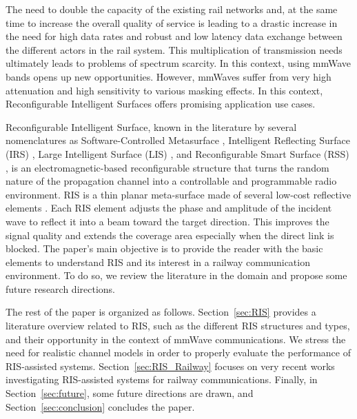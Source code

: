 \documentclass[conference]{IEEEtran}
\begin{document}
The need to double the capacity of the existing rail networks and, at the same time to increase the overall quality of service is leading to a drastic increase in the need for high data rates and robust and low latency data exchange between the different actors in the rail system. This multiplication of transmission needs ultimately leads to problems of spectrum scarcity. In this context, using mmWave bands opens up new opportunities. However, mmWaves  suffer from very high attenuation and high sensitivity to various masking effects. In this context, Reconfigurable Intelligent Surfaces offers promising application use cases.

Reconfigurable Intelligent Surface, known in the literature by several nomenclatures as  Software-Controlled Metasurface \cite{liaskos2018new}, Intelligent Reflecting Surface (IRS) \cite{9326394}, Large Intelligent Surface (LIS) \cite{8644519}, and Reconfigurable Smart Surface (RSS) \cite{alfattani2021link},  is an electromagnetic-based reconfigurable structure
 that turns the random nature of the propagation channel into a controllable and programmable radio environment. RIS is a thin planar meta-surface made of several low-cost reflective elements \cite{8910627}. Each RIS element adjusts the phase and amplitude of the incident wave to reflect it into a beam toward the target direction. This improves the signal quality and extends the coverage area especially when the direct link is blocked. The paper's main objective is to provide the reader with the basic elements to understand RIS and its interest in a railway communication environment. To do so, we review the literature in the domain and propose some future research directions.
 
  
The rest of the paper is organized as follows. Section~\ref{sec:RIS} provides a literature overview related to RIS, such as the different RIS structures and types, and their opportunity in the context of mmWave communications. We stress the need for realistic channel models in order to properly evaluate the performance of RIS-assisted systems. Section~\ref{sec:RIS_Railway} focuses on very recent  works investigating RIS-assisted systems for railway communications. Finally, in Section~\ref{sec:future}, some future directions are drawn, and Section~\ref{sec:conclusion} concludes the paper.
\end{document}
